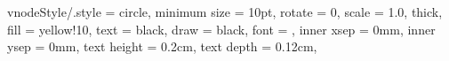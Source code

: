 




\tikzset
{
    vnodeStyle/.style =
    {
        circle,                                 %
        minimum size    = 10pt,                %
        rotate          = 0,                    %
        scale           = 1.0,                  %
        thick,                                  %
        fill            = yellow!10,             %
        text            = black,                %
        draw            = black,                %
        font            = \scriptsize,              %
        inner xsep      = 0mm,                  %
        inner ysep      = 0mm,                  %
        text height     = 0.2cm,
        text depth      = 0.12cm,
    }
}






